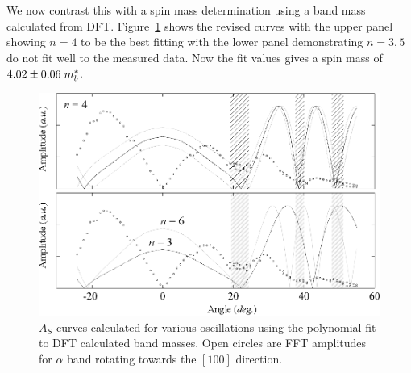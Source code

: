 We now contrast this with a spin mass determination using a band mass calculated from \ac{DFT}. Figure~\ref{Fig:ResD:SpinMassFromDFTBand4} shows the revised curves with the upper panel showing $n=4$ to be the best fitting with the lower panel demonstrating $n = 3, 5$ do not fit well to the measured data. Now the fit values gives a spin mass of $4.02\pm0.06\; m^*_b$.
\begin{figure}[htbp]
    \begin{center}
        \includegraphics[scale=0.7]{Chapter-dHvABaFe2P2/Figures/Mass/SpinMassBand4/SpinMassBand4}
        \caption{$A_S$ curves calculated for various oscillations using the polynomial fit to \ac{DFT} calculated band masses. Open circles are \ac{FFT} amplitudes for $\alpha$ band rotating towards the $[100]$ direction.}
        \label{Fig:ResD:SpinMassFromDFTBand4}
    \end{center}
\end{figure}
